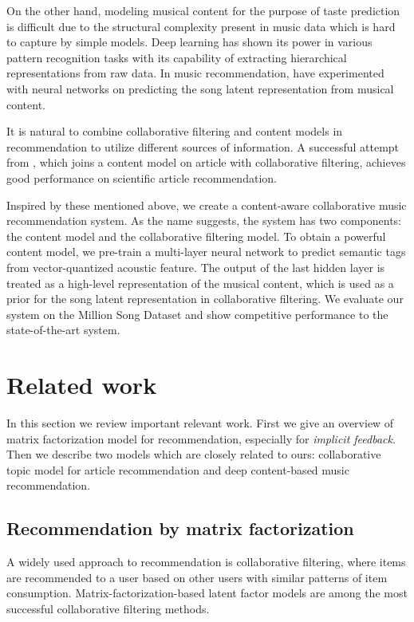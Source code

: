 On the other hand, modeling musical content for the purpose of taste prediction is difficult due to the structural complexity present in music data which is hard to capture by simple models. Deep learning has shown its power in various pattern recognition tasks with its capability of extracting hierarchical representations from raw data. In music recommendation, \citet{van2013deep} have experimented with neural networks on predicting the song latent representation from musical content.  

It is natural to combine collaborative filtering and content models in recommendation to utilize different sources of information. A successful attempt from \citet{wang2011collaborative}, which joins a content model on article with collaborative filtering, achieves good performance on scientific article recommendation.

Inspired by these mentioned above, we create a content-aware collaborative music recommendation system. As the name suggests, the system has two components: the content model and the collaborative filtering model. To obtain a powerful content model, we pre-train a multi-layer neural network to predict semantic tags from vector-quantized acoustic feature. The output of the last hidden layer is treated as a high-level representation of the musical content, which is used as a prior for the song latent representation in collaborative filtering. We evaluate our system on the Million Song Dataset and show competitive performance to the state-of-the-art system.



\section{Related work}\label{sec:related}

In this section we review important relevant work. First we give an overview of matrix factorization model for recommendation, especially for \emph{implicit feedback}. Then we describe two models which are closely related to ours: collaborative topic model for article recommendation and deep content-based music recommendation.

\subsection{Recommendation by matrix factorization}\label{sec:huetal}
A widely used approach to recommendation is collaborative filtering, where items are recommended to a user based on other
users with similar patterns of item consumption. Matrix-factorization-based latent factor models \citep{hu2008collaborative, koren2009matrix} are among the most successful collaborative filtering methods. 

